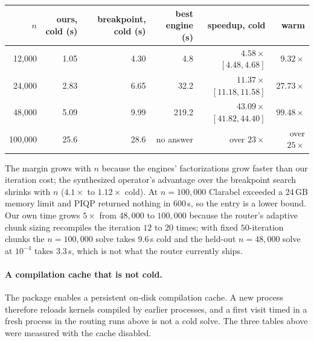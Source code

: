 \documentclass[11pt]{article}
\begin{document}
\begin{center}
\small
\begin{tabular}{rrrrrr}
\toprule
$n$ & ours, cold (s) & breakpoint, cold (s) & best engine (s) & speedup, cold & warm \\
\midrule
12{,}000 & 1.05 & 4.30 & 4.8 & $4.58\times$ $[4.48, 4.68]$ & $9.32\times$ \\
24{,}000 & 2.83 & 6.65 & 32.2 & $11.37\times$ $[11.18, 11.58]$ & $27.73\times$ \\
48{,}000 & 5.09 & 9.99 & 219.2 & $43.09\times$ $[41.82, 44.40]$ & $99.48\times$ \\
100{,}000 & 25.6 & 28.6 & no answer & over $23\times$ & over $25\times$ \\
\bottomrule
\end{tabular}
\end{center}

The margin grows with $n$ because the engines' factorizations grow faster than
our iteration cost; the synthesized operator's advantage over the breakpoint
search shrinks with $n$ ($4.1\times$ to $1.12\times$ cold). At $n = 100{,}000$
Clarabel exceeded a 24\,GB memory limit and PIQP returned nothing in $600$\,s, so
the entry is a lower bound. Our own time grows $5\times$ from $48{,}000$ to
$100{,}000$ because the router's adaptive chunk sizing recompiles the iteration
$12$ to $20$ times; with fixed $50$-iteration chunks the $n = 100{,}000$ solve
takes $9.6$\,s cold and the held-out $n = 48{,}000$ solve at $10^{-4}$ takes
$3.3$\,s, which is not what the router currently ships.

\paragraph{A compilation cache that is not cold.}
The package enables a persistent on-disk compilation cache. A new process
therefore reloads kernels compiled by earlier processes, and a first visit timed
in a fresh process in the routing runs above is not a cold solve. The three tables
above were measured with the cache disabled.
\end{document}
